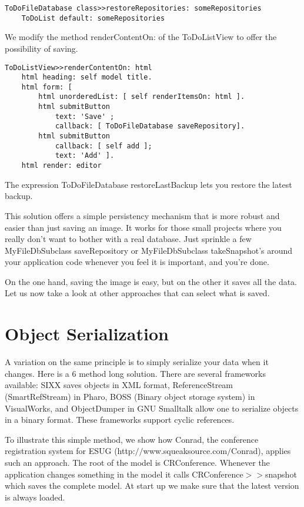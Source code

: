 \documentclass[a4paper,10pt,twoside]{book}
\newcommand{\ct}[1]{{\small\ttfamily\textup{#1}}}
\begin{document}
\begin{lstlisting}
ToDoFileDatabase class>>restoreRepositories: someRepositories
    ToDoList default: someRepositories
\end{lstlisting}

We modify the method \ct{renderContentOn:} of the \ct{ToDoListView}
to offer the possibility of saving.

\begin{lstlisting}
ToDoListView>>renderContentOn: html
    html heading: self model title.
    html form: [
        html unorderedList: [ self renderItemsOn: html ].
        html submitButton
            text: 'Save' ;
            callback: [ ToDoFileDatabase saveRepository].
        html submitButton
            callback: [ self add ];
            text: 'Add' ].
    html render: editor
\end{lstlisting}

The expression \ct{ToDoFileDatabase restoreLastBackup} lets you restore the latest backup.

This solution offers a simple persistency mechanism that is more robust and easier than just saving an image. It works for those small projects where you really don't want to bother with a real database. Just sprinkle a few \ct{MyFileDbSubclass saveRepository} or \ct{MyFileDbSubclass takeSnapshot}'s around your application code whenever you feel it is important, and you're done.

On the one hand, saving the image is easy, but on the other it saves all the data. Let us now take a look at other approaches that can select what is saved.

\section{Object Serialization}
\label{book:advanced:persistency:objectserialization}

A variation on the same principle is to simply serialize your data when it changes. Here is a 6 method long solution. There are several frameworks available: SIXX saves objects in XML format, ReferenceStream (SmartRefStream) in Pharo, BOSS (Binary object storage system) in VisualWorks, and ObjectDumper in GNU Smalltalk allow one to serialize objects in a binary format. These frameworks support cyclic references.

To illustrate this simple method, we show how Conrad, the conference registration system for ESUG (http:$/$$/$www.squeaksource.com$/$Conrad), applies such an approach. The root of the model is \ct{CRConference}. Whenever the application changes something in the model it calls \ct{CRConference$>$$>$snapshot} which saves the complete model. At start up we make sure that the latest version is always loaded.
\end{document}
